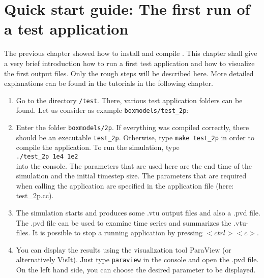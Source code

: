 \section[Quick start guide]{Quick start guide: The first run of a test application}\label{quick-start-guide}

The previous chapter showed how to install and compile \Dumux. This chapter shall give a very brief introduction how to run a first test application and how to visualize the first output files. Only the rough steps will be described here. More detailed explanations can be found in the tutorials in the following chapter.

\begin{enumerate}
 \item Go to the directory \texttt{/test}. There, various test application folders can be found. Let us consider as example \texttt{boxmodels/test{\_}2p}:
 \item Enter the folder \texttt{boxmodels/2p}. If everything was compiled correctly, there should be an executable \texttt{test{\_}2p}. Otherwise, type \texttt{make test{\_}2p} in order to compile the application. To run the simulation, type\\ 
\texttt{./test{\_}2p 1e4 1e2}\\
into the console. The parameters that are used here are the end time of the simulation and the initial timestep size. The parameters that are required when calling the application are specified in the application file (here: test{\_}2p.cc).
 \item The simulation starts and produces some .vtu output files and also a .pvd file. The .pvd file can be used to examine time series and summarizes the .vtu-files. It is possible to stop a running application by pressing $<ctrl><c>$.
 \item You can display the results using the visualization tool ParaView (or alternatively VisIt). Just type \texttt{paraview} in the console and open the .pvd file. On the left hand side, you can choose the desired parameter to be displayed.
\end{enumerate}
% 
%
%


